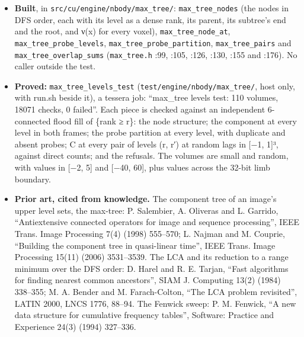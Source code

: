 \begin{itemize}
a rectangle sum over the two DFS ranges, and one Fenwick sweep of J answers every asked pair of levels. The census (one partner, unpaired, mutual, forked) is the degrees of the support of C at the chosen levels. The tracker's overlap still recounts per sampled cut (built: \texttt{max\_\allowbreak{}tree\_\allowbreak{}pairs} and \texttt{max\_\allowbreak{}tree\_\allowbreak{}overlap\_\allowbreak{}sums}, one Fenwick sweep instead of a summed-area table; proved against direct counts).
\item \textbf{Built}, in \texttt{src/\allowbreak{}cu/\allowbreak{}engine/\allowbreak{}nbody/\allowbreak{}max\_\allowbreak{}tree/\allowbreak{}}: \texttt{max\_\allowbreak{}tree\_\allowbreak{}nodes} (the nodes in DFS order, each with its level as a dense rank, its parent, its subtree's end and the root, and ν(x) for every voxel), \texttt{max\_\allowbreak{}tree\_\allowbreak{}node\_\allowbreak{}at}, \texttt{max\_\allowbreak{}tree\_\allowbreak{}probe\_\allowbreak{}levels}, \texttt{max\_\allowbreak{}tree\_\allowbreak{}probe\_\allowbreak{}partition}, \texttt{max\_\allowbreak{}tree\_\allowbreak{}pairs} and \texttt{max\_\allowbreak{}tree\_\allowbreak{}overlap\_\allowbreak{}sums} (\texttt{max\_\allowbreak{}tree.\allowbreak{}h} :99, :105, :126, :130, :155 and :176). No caller outside the test.
\item \textbf{Proved:} \texttt{max\_\allowbreak{}tree\_\allowbreak{}levels\_\allowbreak{}test} (\texttt{test/\allowbreak{}engine/\allowbreak{}nbody/\allowbreak{}max\_\allowbreak{}tree/\allowbreak{}}, host only, with run.sh beside it), a tessera job: “max\_\allowbreak{}tree levels test: 110 volumes, 18071 checks, 0 failed”. Each piece is checked against an independent 6-connected flood fill of \{rank ≥ r\}: the node structure; the component at every level in both frames; the probe partition at every level, with duplicate and absent probes; C at every pair of levels (r, r′) at random lags in [−1, 1]³, against direct counts; and the refusals. The volumes are small and random, with values in [−2, 5] and [−40, 60], plus values across the 32-bit limb boundary.
\item \textbf{Prior art, cited from knowledge.} The component tree of an image's upper level sets, the max-tree: P. Salembier, A. Oliveras and L. Garrido, “Antiextensive connected operators for image and sequence processing”, IEEE Trans. Image Processing 7(4) (1998) 555–570; L. Najman and M. Couprie, “Building the component tree in quasi-linear time”, IEEE Trans. Image Processing 15(11) (2006) 3531–3539. The LCA and its reduction to a range minimum over the DFS order: D. Harel and R. E. Tarjan, “Fast algorithms for finding nearest common ancestors”, SIAM J. Computing 13(2) (1984) 338–355; M. A. Bender and M. Farach-Colton, “The LCA problem revisited”, LATIN 2000, LNCS 1776, 88–94. The Fenwick sweep: P. M. Fenwick, “A new data structure for cumulative frequency tables”, Software: Practice and Experience 24(3) (1994) 327–336.
\end{itemize}

